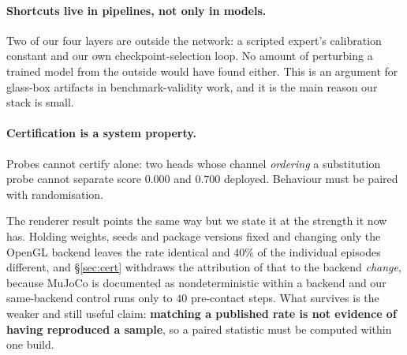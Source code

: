 \documentclass[10pt,twocolumn]{article}
\begin{document}
\paragraph{Shortcuts live in pipelines, not only in models.} Two of our four
layers are outside the network: a scripted expert's calibration constant and our
own checkpoint-selection loop. No amount of perturbing a trained model from the
outside would have found either. This is an argument for glass-box artifacts in
benchmark-validity work, and it is the main reason our stack is small.

\paragraph{Certification is a system property.} Probes cannot certify alone:
two heads whose channel \emph{ordering} a substitution probe cannot separate
score $0.000$ and $0.700$ deployed. Behaviour must be paired with
randomisation.

The renderer result points the same way but we state it at the strength it now
has. Holding weights, seeds and package versions fixed and changing only the
OpenGL backend leaves the rate identical and $40\%$ of the individual episodes
different, and \S\ref{sec:cert} withdraws the attribution of that to the
backend \emph{change}, because MuJoCo is documented as nondeterministic within
a backend and our same-backend control runs only to $40$ pre-contact steps.
What survives is the weaker and still useful claim: \textbf{matching a
published rate is not evidence of having reproduced a sample}, so a paired
statistic must be computed within one build.
\end{document}

